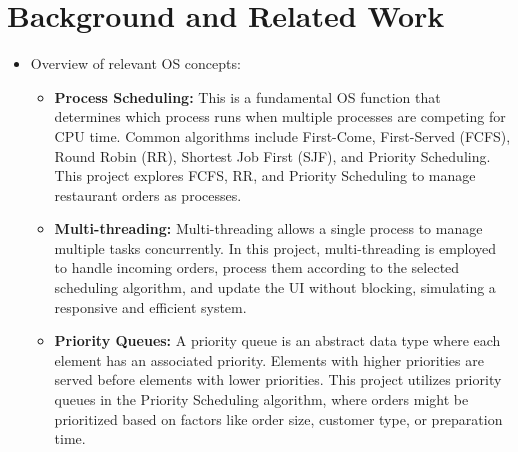 \documentclass[a4paper,12pt]{article}
\begin{document}
\section{Background and Related Work}
\begin{itemize}
    \item Overview of relevant OS concepts:
        \begin{itemize}
            \item \textbf{Process Scheduling:} This is a fundamental OS function that determines which process runs when multiple processes are competing for CPU time. Common algorithms include First-Come, First-Served (FCFS), Round Robin (RR), Shortest Job First (SJF), and Priority Scheduling. This project explores FCFS, RR, and Priority Scheduling to manage restaurant orders as processes.
            \item \textbf{Multi-threading:} Multi-threading allows a single process to manage multiple tasks concurrently. In this project, multi-threading is employed to handle incoming orders, process them according to the selected scheduling algorithm, and update the UI without blocking, simulating a responsive and efficient system.
            \item \textbf{Priority Queues:} A priority queue is an abstract data type where each element has an associated priority. Elements with higher priorities are served before elements with lower priorities. This project utilizes priority queues in the Priority Scheduling algorithm, where orders might be prioritized based on factors like order size, customer type, or preparation time.
        \end{itemize}
\end{itemize}
\newpage

\end{document}
